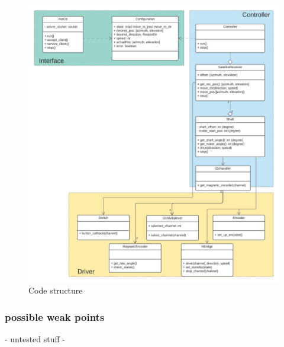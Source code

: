 \begin{figure}[h]
	\centering
	\includegraphics[scale=0.5]{../art/SatelliteReceiver.pdf}
	\caption{Code structure}
\end{figure}


\subsubsection{possible weak points}
- untested stuff
- 